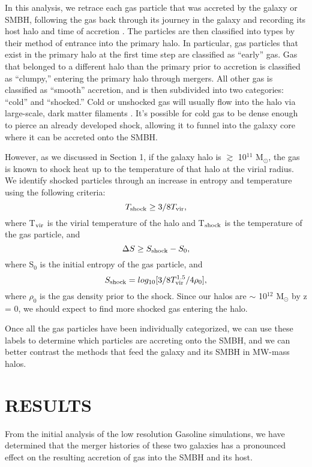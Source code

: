 \documentclass[12pt,headA,chapB]{fiskthesis}
\begin{document}
In this analysis, we retrace each gas particle that was accreted by the galaxy or SMBH, following the gas back through its journey in the galaxy and recording its host halo and time of accretion \citep{Brooks2009}. The particles are then classified into types by their method of entrance into the primary halo. In particular, gas particles that exist in the primary halo at the first time step are classified as ``early'' gas. Gas that belonged to a different halo than the primary prior to accretion is classified as ``clumpy,'' entering the primary halo through mergers. All other gas is classified as ``smooth'' accretion, and is then subdivided into two categories: ``cold'' and ``shocked.'' Cold or unshocked gas will usually flow into the halo via large-scale, dark matter filaments \citep{Bellovary2013}. It's possible for cold gas to be dense enough to pierce an already developed shock, allowing it to funnel into the galaxy core where it can be accreted onto the SMBH.

However, as we discussed in Section 1, if the galaxy halo is $\gtrsim$ 10$^{11}$ M$_{\odot} $, the gas is known to shock heat up to the temperature of that halo at the virial radius. We identify shocked particles through an increase in entropy and temperature using the following criteria:
\begin{equation}
T_{\rm shock} \geq 3/8 T_{\rm vir},
\end{equation}
where T$_{\rm vir}$ is the virial temperature of the halo and T$_{\rm shock}$ is the temperature of the gas particle, and 
\begin{equation}
\Delta S \geq S_{\rm shock} - S_0,
\end{equation}
where S$_0$ is the initial entropy of the gas particle, and 
\begin{equation}
S_{\rm shock} = log_{10}[3/8 T_{\rm vir}^{1.5}/4 \rho_0],
\end{equation}
where $\rho_0$ is the gas density prior to the shock. Since our halos are $\sim$ 10$^{12}$ M$_{\odot} $ by z = 0, we should expect to find more shocked gas entering the halo.

Once all the gas particles have been individually categorized, we can use these labels to determine which particles are accreting onto the SMBH, and we can better contrast the methods that feed the galaxy and its SMBH in MW-mass halos.


\chapter{\normalsize RESULTS}
\thispagestyle{empty}
From the initial analysis of the low resolution Gasoline simulations, we have determined that the merger histories of these two galaxies has a pronounced effect on the resulting accretion of gas into the SMBH and its host. 
\end{document}
